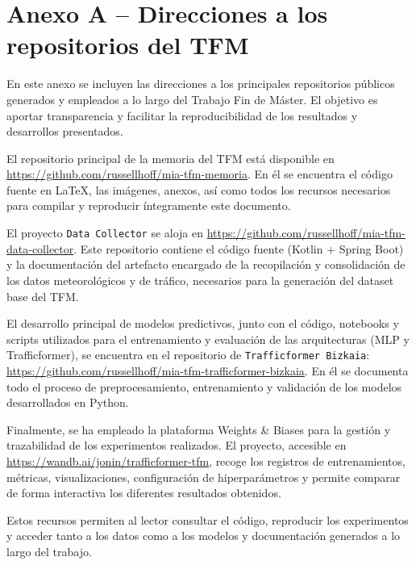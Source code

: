 \section*{Anexo A – Direcciones a los repositorios del TFM}
\label{anexo:repositorios}

En este anexo se incluyen las direcciones a los principales repositorios públicos generados y empleados a lo largo del Trabajo Fin de Máster. El objetivo es aportar transparencia y facilitar la reproducibilidad de los resultados y desarrollos presentados.

El repositorio principal de la memoria del TFM está disponible en \url{https://github.com/russellhoff/mia-tfm-memoria}. En él se encuentra el código fuente en \LaTeX{}, las imágenes, anexos, así como todos los recursos necesarios para compilar y reproducir íntegramente este documento.

El proyecto \texttt{Data Collector} se aloja en \url{https://github.com/russellhoff/mia-tfm-data-collector}. Este repositorio contiene el código fuente (Kotlin + Spring Boot) y la documentación del artefacto encargado de la recopilación y consolidación de los datos meteorológicos y de tráfico, necesarios para la generación del dataset base del TFM.

El desarrollo principal de modelos predictivos, junto con el código, notebooks y scripts utilizados para el entrenamiento y evaluación de las arquitecturas (MLP y Trafficformer), se encuentra en el repositorio de \texttt{Trafficformer Bizkaia}: \url{https://github.com/russellhoff/mia-tfm-trafficformer-bizkaia}. En él se documenta todo el proceso de preprocesamiento, entrenamiento y validación de los modelos desarrollados en Python.

Finalmente, se ha empleado la plataforma Weights \& Biases para la gestión y trazabilidad de los experimentos realizados. El proyecto, accesible en \url{https://wandb.ai/jonin/trafficformer-tfm}, recoge los registros de entrenamientos, métricas, visualizaciones, configuración de hiperparámetros y permite comparar de forma interactiva los diferentes resultados obtenidos.

\vspace{0.5cm}

Estos recursos permiten al lector consultar el código, reproducir los experimentos y acceder tanto a los datos como a los modelos y documentación generados a lo largo del trabajo.